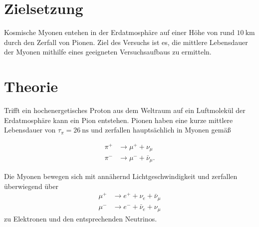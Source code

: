 \section{Zielsetzung}
\label{sec:Zielsetzung}
Kosmische Myonen entehen in der Erdatmosphäre auf einer Höhe von rund $\qty{10}{\kilo\metre}$ durch den Zerfall von Pionen. Ziel des Versuchs ist es, die 
mittlere Lebensdauer der Myonen mithilfe eines geeigneten Versuchsaufbaus zu ermitteln.


\section{Theorie}
\label{sec:Theorie}
Trifft ein hochenergetisches Proton aus dem Weltraum auf ein Luftmolekül der Erdatmosphäre kann ein Pion entstehen. Pionen haben eine kurze mittlere 
Lebensdauer von $\tau_\pi = \qty{26}{\nano\second}$ und zerfallen hauptsächlich in Myonen gemäß

\begin{align*}
    \pi^+ &\to \mu^+ + \nu_\mu \\
    \pi^- &\to \mu^- + \bar{\nu}_\mu.
\end{align*}

Die Myonen bewegen sich mit annähernd Lichtgeschwindigkeit und zerfallen überwiegend über 
\begin{align*}
    \mu^+ &\to e^+ + \nu_e + \bar{\nu}_\mu \\
    \mu^- &\to e^- + \bar{\nu}_e + \nu_\mu
\end{align*}
zu Elektronen und den entsprechenden Neutrinos.

\cite{Wermes}
\cite{V01}

